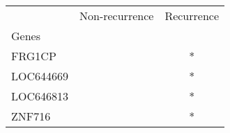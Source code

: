 \begin{tabular}{lcc}
\toprule
{} & Non-recurrence & Recurrence \\
Genes     &                &            \\
\midrule
FRG1CP    &                &          * \\
LOC644669 &                &          * \\
LOC646813 &                &          * \\
ZNF716    &                &          * \\
\bottomrule
\end{tabular}
